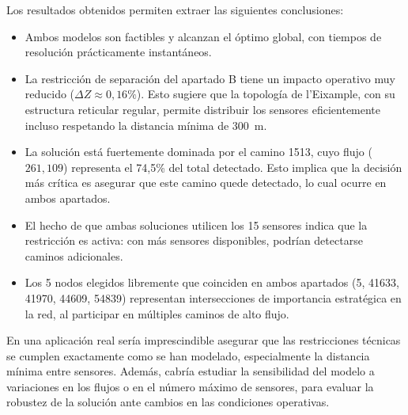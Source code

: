 \documentclass[12pt,a4paper]{article}
\begin{document}
Los resultados obtenidos permiten extraer las siguientes conclusiones:

\begin{itemize}[itemsep=4pt]
    \item Ambos modelos son factibles y alcanzan el óptimo global, con tiempos de resolución prácticamente instantáneos.
    \item La restricción de separación del apartado B tiene un impacto operativo muy reducido ($\Delta Z \approx 0{,}16\%$). Esto sugiere que la topología de l'Eixample, con su estructura reticular regular, permite distribuir los sensores eficientemente incluso respetando la distancia mínima de 300~m.
    \item La solución está fuertemente dominada por el camino 1513, cuyo flujo ($261{,}109$) representa el 74,5\% del total detectado. Esto implica que la decisión más crítica es asegurar que este camino quede detectado, lo cual ocurre en ambos apartados.
    \item El hecho de que ambas soluciones utilicen los 15 sensores indica que la restricción es activa: con más sensores disponibles, podrían detectarse caminos adicionales.
    \item Los 5 nodos elegidos libremente que coinciden en ambos apartados (5, 41633, 41970, 44609, 54839) representan intersecciones de importancia estratégica en la red, al participar en múltiples caminos de alto flujo.
\end{itemize}

En una aplicación real sería imprescindible asegurar que las restricciones técnicas se cumplen exactamente como se han modelado, especialmente la distancia mínima entre sensores. Además, cabría estudiar la sensibilidad del modelo a variaciones en los flujos o en el número máximo de sensores, para evaluar la robustez de la solución ante cambios en las condiciones operativas.
\end{document}
